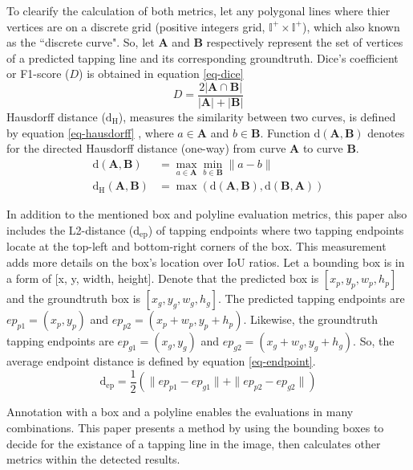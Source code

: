 \documentclass[default,pdflatex,iicol]{sn-jnl}%
\begin{document}
To clearify the calculation of both metrics, let any polygonal lines where thier vertices are on a discrete grid (positive integers grid, $\mathbb{I^+}\times \mathbb{I^+}$), which also known as the ``discrete curve". So, let $\textbf{A}$ and $\textbf{B}$ respectively represent the set of vertices of a predicted tapping line and its corresponding groundtruth. Dice's coefficient or F1-score ($D$) is obtained in equation \ref{eq-dice}
\begin{equation}
D = \frac{2 \lvert \textbf{A} \cap \textbf{B} \rvert }{\lvert\textbf{A}\rvert+\lvert\textbf{B}\rvert}\label{eq-dice}
\end{equation}
Hausdorff distance ($\mathrm{d_H}$), measures the similarity between two curves, is defined by equation \ref{eq-hausdorff} \cite{Huttenlocher1993ComparingIU}, where $a \in \textbf{A}$ and $b \in \textbf{B}$. Function $\mathrm{d}(\textbf{A},\textbf{B})$ denotes for the directed Hausdorff distance (one-way) from curve \textbf{A} to curve \textbf{B}.
\begin{align}
\mathrm{d}(\textbf{A},\textbf{B}) &= \max_{a\in\textbf{A}} \min_{b\in\textbf{B}} \| a-b \|  \nonumber \\
\mathrm{d_H}(\textbf{A},\textbf{B}) &= \max (\mathrm{d}(\textbf{A},\textbf{B}), \mathrm{d}(\textbf{B},\textbf{A})) \label{eq-hausdorff}
\end{align}

In addition to the mentioned box and polyline evaluation metrics, this paper also includes the L2-distance ($\mathrm{d_{ep}}$) of tapping endpoints where two tapping endpoints locate at the top-left and bottom-right corners of the box. This measurement adds more details on the box's location over IoU ratios. Let a bounding box is in a form of [x, y, width, height]. Denote that the predicted box is $[x_p, y_p, w_p, h_p]$ and the groundtruth box is $[x_g, y_g, w_g, h_g]$. The predicted tapping endpoints are $ep_{p1} = (x_p, y_p)$ and $ep_{p2} = (x_p+w_p, y_p+h_p)$. Likewise, the groundtruth tapping endpoints are $ep_{g1} = (x_g, y_g)$ and $ep_{g2} = (x_g+w_g, y_g+h_g)$. So, the average endpoint distance is defined by equation \ref{eq-endpoint}.
\begin{equation}
\mathrm{d_{ep}} = \frac{1}{2} (\| ep_{p1}- ep_{g1} \| + \| ep_{p2}  - ep_{g2} \|) \label{eq-endpoint}
\end{equation}

Annotation with a box and a polyline enables the evaluations in many combinations. This paper presents a method by using the bounding boxes to decide for the existance of a tapping line in the image, then calculates other metrics within the detected results.
\end{document}
